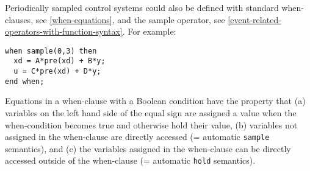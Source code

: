 \begin{nonnormative}
Periodically sampled control systems could also be defined with
standard when-clauses, see \cref{when-equations}, and the sample operator, see
\cref{event-related-operators-with-function-syntax}. For example:
\begin{lstlisting}[language=modelica]
when sample(0,3) then
  xd = A*pre(xd) + B*y;
  u = C*pre(xd) + D*y;
end when;
\end{lstlisting}

Equations in a when-clause with a Boolean condition have the
property that (a) variables on the left hand side of the equal sign are
assigned a value when the when-condition becomes true and otherwise hold
their value, (b) variables not assigned in the when-clause are directly
accessed (= automatic \lstinline!sample! semantics), and (c) the variables
assigned in the when-clause can be directly accessed outside of the
when-clause (= automatic \lstinline!hold! semantics).


\end{nonnormative}

